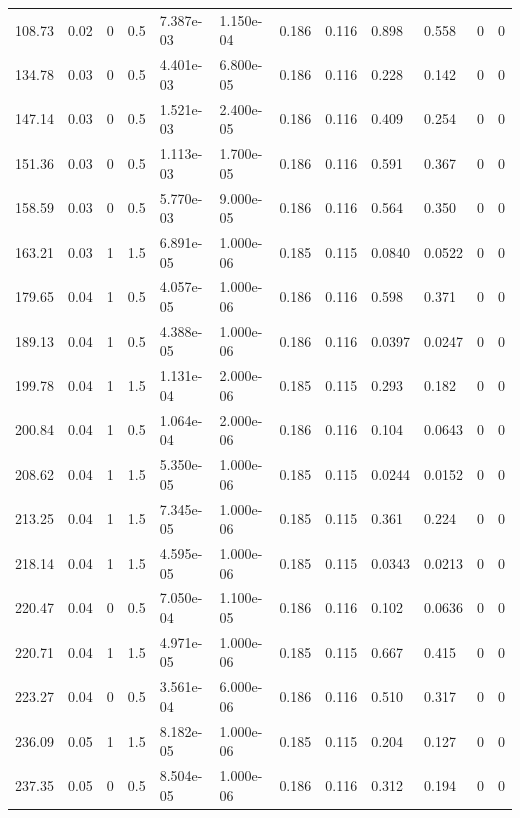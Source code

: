\documentclass[preview]{standalone}
\begin{document}
{{\begin{tabular}{L{1.2cm}C{1.2cm} C{0.3cm}C{0.5cm} C{1.4cm}C{1.4cm} C{1.4cm}C{1.4cm} C{1.6cm}C{1.6cm} C{1.6cm}C{1.6cm}}
  108.73  &  0.02  & 0     & 0.5 &  7.387e-03  & 1.150e-04  &  0.186&   0.116& 0.898 & 0.558   &  0 & 0  \\ 
  134.78  &  0.03  & 0     & 0.5 &  4.401e-03  & 6.800e-05  &  0.186&   0.116& 0.228 & 0.142   &  0 & 0  \\ 
  147.14  &  0.03  & 0     & 0.5 &  1.521e-03  & 2.400e-05  &  0.186&   0.116& 0.409 & 0.254   &  0 & 0  \\ 
  151.36  &  0.03  & 0     & 0.5 &  1.113e-03  & 1.700e-05  &  0.186&   0.116& 0.591 & 0.367   &  0 & 0  \\ 
  158.59  &  0.03  & 0     & 0.5 &  5.770e-03  & 9.000e-05  &  0.186&   0.116& 0.564 & 0.350   &  0 & 0  \\ 
  163.21  &  0.03  & 1     & 1.5 &  6.891e-05  & 1.000e-06  &  0.185&   0.115& 0.0840 & 0.0522   &  0 & 0  \\ 
  179.65  &  0.04  & 1     & 0.5 &  4.057e-05  & 1.000e-06  &  0.186&   0.116& 0.598 & 0.371   &  0 & 0  \\ 
  189.13  &  0.04  & 1     & 0.5 &  4.388e-05  & 1.000e-06  &  0.186&   0.116& 0.0397 & 0.0247   &  0 & 0  \\ 
  199.78  &  0.04  & 1     & 1.5 &  1.131e-04  & 2.000e-06  &  0.185&   0.115& 0.293 & 0.182   &  0 & 0  \\ 
  200.84  &  0.04  & 1     & 0.5 &  1.064e-04  & 2.000e-06  &  0.186&   0.116& 0.104 & 0.0643   &  0 & 0  \\ 
  208.62  &  0.04  & 1     & 1.5 &  5.350e-05  & 1.000e-06  &  0.185&   0.115& 0.0244 & 0.0152   &  0 & 0  \\ 
  213.25  &  0.04  & 1     & 1.5 &  7.345e-05  & 1.000e-06  &  0.185&   0.115& 0.361 & 0.224   &  0 & 0  \\ 
  218.14  &  0.04  & 1     & 1.5 &  4.595e-05  & 1.000e-06  &  0.185&   0.115& 0.0343 & 0.0213   &  0 & 0  \\ 
  220.47  &  0.04  & 0     & 0.5 &  7.050e-04  & 1.100e-05  &  0.186&   0.116& 0.102 & 0.0636   &  0 & 0  \\ 
  220.71  &  0.04  & 1     & 1.5 &  4.971e-05  & 1.000e-06  &  0.185&   0.115& 0.667 & 0.415   &  0 & 0  \\ 
  223.27  &  0.04  & 0     & 0.5 &  3.561e-04  & 6.000e-06  &  0.186&   0.116& 0.510 & 0.317   &  0 & 0  \\ 
  236.09  &  0.05  & 1     & 1.5 &  8.182e-05  & 1.000e-06  &  0.185&   0.115& 0.204 & 0.127   &  0 & 0  \\ 
  237.35  &  0.05  & 0     & 0.5 &  8.504e-05  & 1.000e-06  &  0.186&   0.116& 0.312 & 0.194   &  0 & 0  \\ 

\end{tabular}}}
\end{document}
